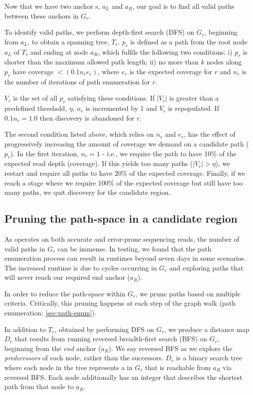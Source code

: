 Now that we have two anchor \kmer{}s, $a_L$ and $a_R$, our goal is to find all valid paths between these anchors in $G_r$.

To identify valid paths, we perform depth-first search (DFS) on $G_r$, beginning from $a_L$, to obtain a spanning tree, $T_r$. $p_r$ is defined as a path from the root node $a_L$ of $T_r$ and ending at node $a_R$, which fulfils the following two conditions: i) $p_r$ is shorter than the maximum allowed path length; ii) no more than $k$ nodes along $p_r$ have coverage $< (0.1 n_r e_r)$, where $e_r$ is the expected \kmer{} coverage for $r$ and $n_r$ is the number of iterations of path enumeration for $r$.

$V_r$ is the set of all $p_r$ satisfying these conditions. If $|V_r|$ is greater than a predefined threshold, $\eta$, $n_r$ is incremented by 1 and $V_r$ is repopulated. If $0.1n_r = 1.0$ then \denovo{} discovery is abandoned for $r$.

The second condition listed above, which relies on $n_r$ and $e_r$, has the effect of progressively increasing the amount of coverage we demand on a candidate path ($p_r$). In the first iteration, $n_r=1$ - i.e., we require the path to have 10\% of the expected read depth (coverage). If this yields too many paths ($|V_r|>\eta$), we restart and require all paths to have 20\% of the expected coverage. Finally, if we reach a stage where we require 100\% of the expected coverage but still have too many paths, we quit \denovo{} discovery for the candidate region.

\subsection{Pruning the path-space in a candidate region}
\label{sec:denovo-prune}

As \pandora{} operates on both accurate and error-prone sequencing reads, the number of valid paths in $G_r$ can be immense. In testing, we found that the path enumeration process can result in runtimes beyond seven days in some scenarios. The increased runtime is due to cycles occurring in $G_r$ and exploring paths that will never reach our required end anchor ($a_R$). 

In order to reduce the path-space within $G_r$, we prune paths based on multiple criteria. Critically, this pruning happens at each step of the graph walk (path enumeration; \autoref{sec:path-enum}).

In addition to $T_r$, obtained by performing DFS on $G_r$, we produce a distance map $D_r$ that results from running reversed breadth-first search (BFS) on $G_r$, beginning from the \emph{end} anchor ($a_R$). We say reversed BFS as we explore the \emph{predecessors} of each node, rather than the successors. $D_r$ is a binary search tree where each node in the tree represents a \kmer{} in $G_r$ that is reachable from $a_R$ via reversed BFS. Each node additionally has an integer that describes the shortest path from that node to $a_R$.

